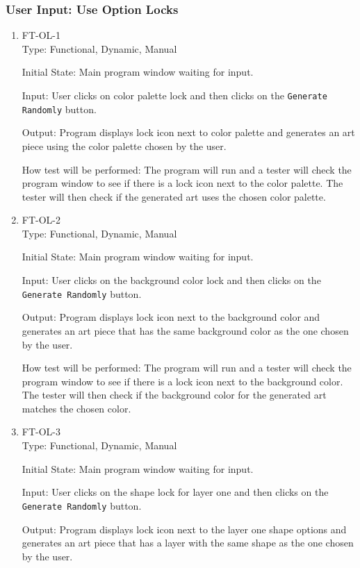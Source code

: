 \documentclass[12pt, titlepage]{article}
\begin{document}
\subsubsection{User Input: Use Option Locks}
\begin{enumerate}

\item{FT-OL-1\\}
Type: Functional, Dynamic, Manual

Initial State: Main program window waiting for input. %

Input: User clicks on color palette lock and then clicks on the \texttt{Generate Randomly} button.

Output: Program displays lock icon next to color palette and generates an art piece using the color palette chosen by the user.

How test will be performed: The program will run and a tester will check the program window to see if there is a lock icon next to the color palette. The tester will then check if the generated art uses the chosen color palette.

\item{FT-OL-2\\}
Type: Functional, Dynamic, Manual

Initial State: Main program window waiting for input. %

Input: User clicks on the background color lock and then clicks on the \texttt{Generate Randomly} button.

Output: Program displays lock icon next to the background color and generates an art piece that has the same background color as the one chosen by the user.

How test will be performed: The program will run and a tester will check the program window to see if there is a lock icon next to the background color. The tester will then check if the background color for the generated art matches the chosen color.

\item{FT-OL-3\\}
Type: Functional, Dynamic, Manual

Initial State: Main program window waiting for input. %

Input: User clicks on the shape lock for layer one and then clicks on the \texttt{Generate Randomly} button.

Output: Program displays lock icon next to the layer one shape options and generates an art piece that has a layer with the same shape as the one chosen by the user.


\end{enumerate}
\end{document}
